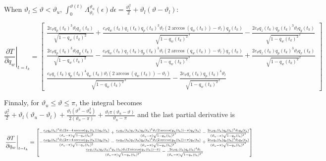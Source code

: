 \documentclass{article}
\newcommand\scalemath[2]{\scalebox{#1}{\mbox{\ensuremath{\displaystyle #2}}}}
\begin{document}
		When $\vartheta_l \leq \vartheta < \vartheta_u$, $\int_0^{\vartheta(t)}{\Lambda_{\vartheta_l}^{\vartheta_u}(\epsilon)} d\epsilon = \frac{\vartheta_l^2}{2} + \vartheta_l \left ( \vartheta-\vartheta_l \right )$:
		
		\[
			\left .\frac{\partial T}{\partial q_w}\right |_{t=t_k}  = \begin{bmatrix}
											\frac{2 c_{\vartheta}q_p(t_k)^3 \vartheta_l q_x(t_k)}{\sqrt{1-q_w(t_k)^2}} + \frac{c_{\vartheta} q_w(t_k) q_z(t_k) q_p(t_k)^3 \vartheta_l \left (2\arccos(q_w(t_k))-\vartheta_l \right ) q_y(t_k)}{\sqrt{1-q_w(t_k)^2}^3} - \frac{2 c_\vartheta q_z(t_k) q_p(t_k)^3 \vartheta_l q_y(t_k)}{\sqrt{1-q_w(t_k)^2}^2}\\
											\frac{2 c_{\vartheta}q_p(t_k)^3 \vartheta_l q_y(t_k)}{\sqrt{1-q_w(t_k)^2}} - \frac{c_{\vartheta} q_w(t_k) q_z(t_k) q_p(t_k)^3 \vartheta_l \left (2\arccos(q_w(t_k))-\vartheta_l \right ) q_x(t_k)}{\sqrt{1-q_w(t_k)^2}^3} + \frac{2 c_\vartheta q_z(t_k) q_p(t_k)^3 \vartheta_l q_x(t_k)}{\sqrt{1-q_w(t_k)^2}^2}\\
											\frac{c_{\vartheta} q_z(t_k) q_p(t_k)^4 q_w(t_k) \vartheta_l \left (2\arccos(q_w(t_k))-\vartheta_l \right )}{\sqrt{1-q_w(t_k)^2}^3} - \frac{2c_{\vartheta} q_z(t_k) q_p(t_k)^4 \vartheta_l}{\sqrt{1-q_w(t_k)^2}^2}
										\end{bmatrix} 
		\]
		
		Finnaly, for $\vartheta_u \leq \vartheta \leq \pi$, the integral becomes $\frac{\vartheta_l^2}{2} + \vartheta_l \left(\vartheta_u-\vartheta_l \right) + \frac{\vartheta_l \left (\vartheta^2 - \vartheta_u^2 \right)}{2\left(\vartheta_u - \pi \right )} + \frac{\vartheta_l \pi \left ( \vartheta_u - \vartheta \right)}{\vartheta_u - \pi}$ and the last partial derivative is
		
		\[
			\left .\frac{\partial T}{\partial q_w}\right |_{t=t_k}  = \scalemath{0.8}{
										\begin{bmatrix}
											-\frac{c_{\vartheta}q_p(t_k)^3 \vartheta_l \left (2\pi-4\arccos(q_w(t_k)) \right) q_x(t_k)}{\left ( \vartheta_u - \pi \right )\sqrt{1-q_w(t_k)^2}} + \frac{c_{\vartheta} q_w(t_k) q_z(t_k) q_p(t_k)^3 \vartheta_l \left (2\arccos(q_w(t_k))-\pi \right ) q_y(t_k)}{\left (\vartheta_u - \pi \right )\sqrt{1-q_w(t_k)^2}^3} - \frac{2 c_\vartheta q_z(t_k) q_p(t_k)^3 \vartheta_l q_y(t_k)}{\left(\vartheta_u - \pi \right )\sqrt{1-q_w(t_k)^2}^2}\\
											-\frac{c_{\vartheta}q_p(t_k)^3 \vartheta_l \left (2\pi-4\arccos(q_w(t_k)) \right) q_y(t_k)}{\left ( \vartheta_u - \pi \right )\sqrt{1-q_w(t_k)^2}} - \frac{c_{\vartheta} q_w(t_k) q_z(t_k) q_p(t_k)^3 \vartheta_l \left (2\arccos(q_w(t_k))-\pi \right ) q_x(t_k)}{\left (\vartheta_u - \pi \right )\sqrt{1-q_w(t_k)^2}^3} + \frac{2 c_\vartheta q_z(t_k) q_p(t_k)^3 \vartheta_l q_x(t_k)}{\left(\vartheta_u - \pi \right )\sqrt{1-q_w(t_k)^2}^2}\\
											\frac{c_{\vartheta} q_z(t_k) q_p(t_k)^4 q_w(t_k) \vartheta_l \left (2\arccos(q_w(t_k))-\pi \right )}{\left(\vartheta_u-\pi \right)\sqrt{1-q_w(t_k)^2}^3} - \frac{2c_{\vartheta} q_z(t_k) q_p(t_k)^4 \vartheta_l}{\left ( \vartheta_u - \pi \right )\sqrt{1-q_w(t_k)^2}^2}
										\end{bmatrix} 
										}
		\]
	
\end{document}

